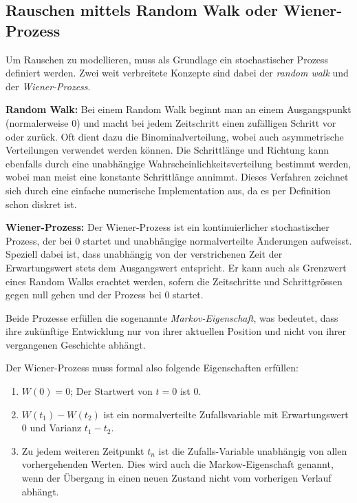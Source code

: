 \subsection{Rauschen mittels Random Walk oder Wiener-Prozess\label{brown:Rauschen:RandomWalkWiener}}

Um Rauschen zu modellieren, muss als Grundlage ein stochastischer Prozess definiert werden. Zwei weit verbreitete Konzepte sind dabei der \textit{random walk} und der \textit{Wiener-Prozess}.

\begin{definition}\textbf{Random Walk:}
	\label{randomWalk}
	Bei einem Random Walk beginnt man an einem Ausgangspunkt (normalerweise 0) und macht bei jedem Zeitschritt einen zufälligen Schritt vor oder zurück. Oft dient dazu die Binominalverteilung, wobei auch asymmetrische Verteilungen verwendet werden können. Die Schrittlänge und Richtung kann ebenfalls durch eine unabhängige Wahrscheinlichkeitsverteilung bestimmt werden, wobei man meist eine konstante Schrittlänge annimmt. Dieses Verfahren zeichnet sich durch eine einfache numerische Implementation aus, da es per Definition schon diskret ist.
\end{definition}

\begin{definition}\textbf{Wiener-Prozess:}
	\label{wienerprozess}
	Der Wiener-Prozess ist ein kontinuierlicher stochastischer Prozess, der bei 0 startet und unabhängige normalverteilte Änderungen aufweisst. Speziell dabei ist, dass unabhängig von der verstrichenen Zeit der Erwartungswert stets dem Ausgangswert entspricht. Er kann auch  als Grenzwert eines Random Walks erachtet werden, sofern die Zeitschritte und Schrittgrössen gegen null gehen und der Prozess bei 0 startet. 
\end{definition}

Beide Prozesse erfüllen die sogenannte \textit{Markov-Eigenschaft}, was bedeutet, dass ihre zukünftige Entwicklung nur von ihrer aktuellen Position und nicht von ihrer vergangenen Geschichte abhängt.

Der Wiener-Prozess muss formal also folgende Eigenschaften erfüllen: 

\begin{enumerate}
	\item $ W(0) = 0 $; Der Startwert von $ t = 0 $ ist 0.
	\item $ W(t_{1}) - W(t_{2}) $ ist ein normalverteilte Zufallsvariable mit Erwartungswert 0 und Varianz $ t_{1} - t_{2} $.
	\item Zu jedem weiteren Zeitpunkt $ t_{n} $ ist die Zufalls-Variable unabhängig von allen vorhergehenden Werten. Dies wird auch die Markow-Eigenschaft genannt, wenn der Übergang in einen neuen Zustand nicht vom vorherigen Verlauf abhängt.
\end{enumerate}

